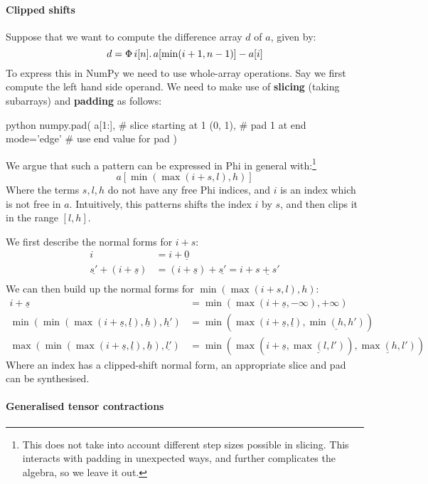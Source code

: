 \paragraph{Clipped shifts} Suppose that we want to compute the difference array $d$ of $a$, given by: 
$$ d = \Phi\, {i}[{n}] \ldotp {a[\min(i + 1, n - 1)] - a[i]} $$ 
To express this in NumPy we need to use whole-array operations. Say we first compute the left hand side operand. We need to make use of \textbf{slicing} (taking subarrays) and \textbf{padding} as follows:
\begin{center}
\begin{cminted}{python}
numpy.pad(
  a[1:],      # slice starting at 1
  (0, 1),     # pad 1 at end
  mode='edge' # use end value for pad
)
\end{cminted}
\end{center}
We argue that such a pattern can be expressed in Phi in general with:\footnote{This does not take into account different step sizes possible in slicing. This interacts with padding in unexpected ways, and further complicates the algebra, so we leave it out.}
$$ a[\min(\max(i + s, l), h)] $$
Where the terms $s, l, h$ do not have any free Phi indices, and $i$ is an index which is not free in $a$. Intuitively, this patterns shifts the index $i$ by $s$, and then clips it in the range $\left[ l, h \right]$.

We first describe the normal forms for $i + s$:
\begin{align*}
i &= i + \underline{0} \\
\underline{s'} + (i + \underline{s}) &= (i + \underline{s}) + \underline{s'} = i + \underline{s + s'} \\
\end{align*}
We can then build up the normal forms for $\min(\max(i + s, l), h)$:
\begin{align*}
i + \underline{s} &= \min(\max(i + \underline{s}, -\infty), +\infty) \\ 
\min(\min(\max(i + \underline{s}, \underline{l}), \underline{h}), \underline{h'}) &= \min(\max(i + \underline{s}, \underline{l}), \underline{\min(h, h')}) \\ 
\max(\min(\max(i + \underline{s}, \underline{l}), \underline{h}), \underline{l'}) &= \min(\max(i + \underline{s}, \underline{\max(l, l')}), \underline{\max(h, l')})
\end{align*}
Where an index has a clipped-shift normal form, an appropriate slice and pad can be synthesised. 

\paragraph{Generalised tensor contractions}

